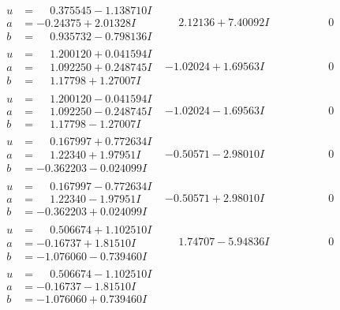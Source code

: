 \documentclass[1p]{elsarticle_modified}
\theoremstyle{definition}
\begin{document}
$$\begin{array}{c|c|c}
\begin{aligned}
u &= \phantom{-}0.375545 - 1.138710 I \\
a &= -0.24375 + 2.01328 I \\
b &= \phantom{-}0.935732 - 0.798136 I\end{aligned}
 & \phantom{-}2.12136 + 7.40092 I & \phantom{-0.000000 } 0 \\ \hline\begin{aligned}
u &= \phantom{-}1.200120 + 0.041594 I \\
a &= \phantom{-}1.092250 + 0.248745 I \\
b &= \phantom{-}1.17798 + 1.27007 I\end{aligned}
 & -1.02024 + 1.69563 I & \phantom{-0.000000 } 0 \\ \hline\begin{aligned}
u &= \phantom{-}1.200120 - 0.041594 I \\
a &= \phantom{-}1.092250 - 0.248745 I \\
b &= \phantom{-}1.17798 - 1.27007 I\end{aligned}
 & -1.02024 - 1.69563 I & \phantom{-0.000000 } 0 \\ \hline\begin{aligned}
u &= \phantom{-}0.167997 + 0.772634 I \\
a &= \phantom{-}1.22340 + 1.97951 I \\
b &= -0.362203 - 0.024099 I\end{aligned}
 & -0.50571 - 2.98010 I & \phantom{-0.000000 } 0 \\ \hline\begin{aligned}
u &= \phantom{-}0.167997 - 0.772634 I \\
a &= \phantom{-}1.22340 - 1.97951 I \\
b &= -0.362203 + 0.024099 I\end{aligned}
 & -0.50571 + 2.98010 I & \phantom{-0.000000 } 0 \\ \hline\begin{aligned}
u &= \phantom{-}0.506674 + 1.102510 I \\
a &= -0.16737 + 1.81510 I \\
b &= -1.076060 - 0.739460 I\end{aligned}
 & \phantom{-}1.74707 - 5.94836 I & \phantom{-0.000000 } 0 \\ \hline\begin{aligned}
u &= \phantom{-}0.506674 - 1.102510 I \\
a &= -0.16737 - 1.81510 I \\
b &= -1.076060 + 0.739460 I\end{aligned}

\end{array}$$
\end{document}
